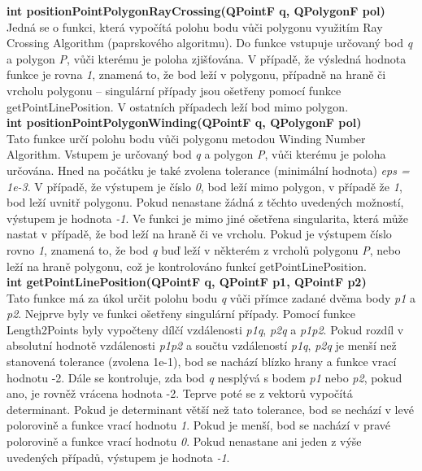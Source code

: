 \documentclass[a4paper,11pt,twoside]{article}
\begin{document}
\noindent\textbf{int positionPointPolygonRayCrossing(QPointF q, QPolygonF pol)}\\
Jedná se o funkci, která vypočítá polohu bodu vůči polygonu využitím Ray Crossing Algorithm (paprskového algoritmu). Do funkce vstupuje určovaný bod \textit{q} a polygon \textit{P}, vůči kterému je poloha zjišťována. V případě, že výsledná hodnota funkce je rovna \textit{1}, znamená to, že bod leží v polygonu, případně na hraně či vrcholu polygonu -- singulární případy jsou ošetřeny pomocí funkce getPointLinePosition. V ostatních případech leží bod mimo polygon.\\

\noindent\textbf{int positionPointPolygonWinding(QPointF q, QPolygonF pol)}\\
Tato funkce určí polohu bodu vůči polygonu metodou Winding Number Algorithm. Vstupem je určovaný bod \textit{q} a polygon \textit{P}, vůči kterému je poloha určována. Hned na počátku je také zvolena tolerance (minimální hodnota) \textit{eps = 1e-3}. V případě, že výstupem je číslo \textit{0}, bod leží mimo polygon, v případě že \textit{1}, bod leží uvnitř polygonu. Pokud nenastane žádná z těchto uvedených možností, výstupem je hodnota \textit{-1}. Ve funkci je mimo jiné ošetřena singularita, která může nastat v případě, že bod leží na hraně či ve vrcholu. Pokud je výstupem číslo rovno \textit{1}, znamená to, že bod \textit{q} buď leží v některém z vrcholů polygonu \textit{P}, nebo leží na hraně polygonu, což je kontrolováno funkcí getPointLinePosition. \\

\noindent\textbf{int getPointLinePosition(QPointF q, QPointF p1, QPointF p2)}\\
Tato funkce má za úkol určit polohu bodu \textit{q} vůči přímce zadané dvěma body \textit{p1} a \textit{p2}. Nejprve byly ve funkci ošetřeny singulární případy. Pomocí funkce Length2Points byly vypočteny dílčí vzdálenosti \textit{p1q}, \textit{p2q} a \textit{p1p2}. Pokud rozdíl v absolutní hodnotě vzdálenosti \textit{p1p2} a součtu vzdáleností \textit{p1q}, \textit{p2q} je menší než stanovená tolerance (zvolena 1e-1), bod se nachází blízko hrany a funkce vrací hodnotu -2. Dále se kontroluje, zda bod \textit{q} nesplývá s bodem \textit{p1} nebo\textit{ p2}, pokud ano, je rovněž vrácena hodnota -2. Teprve poté se z vektorů vypočítá determinant. Pokud je determinant větší než tato tolerance, bod se nechází v levé polorovině a funkce vrací hodnotu \textit{1}. Pokud je menší, bod se nachází v pravé polorovině a funkce vrací hodnotu \textit{0}.  Pokud nenastane ani jeden z výše uvedených případů, výstupem je hodnota \textit{-1}.\\
\end{document}

